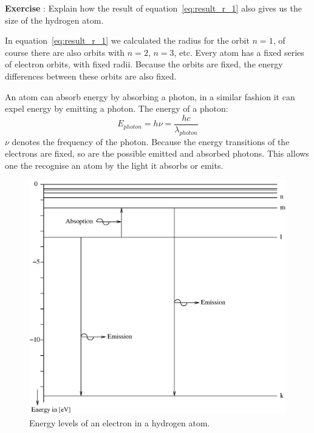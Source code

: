 \documentclass[12pt,a4paper]{article}
\numberwithin{equation}{section}
\numberwithin{figure}{section}
\newcounter{Exercise}
\numberwithin{table}{section}
\begin{document}
\begin{shaded} \textbf{Exercise \theExercise {}} : Explain how the result of equation~\ref{eq:result_r_1} also gives us the size of the hydrogen atom.\end{shaded}

In equation~\ref{eq:result_r_1} we calculated the radius for the orbit $n=1$, of course there are also orbits with $n=2$, $n=3$, etc. Every atom has a fixed series of electron orbits, with fixed radii. Because the orbits are fixed, the energy differences between these orbits are also fixed.

An atom can absorb energy by absorbing a photon, in a similar fashion it can expel energy by emitting a photon. The energy of a photon:
\begin{equation}
E_{photon} = h\nu = \frac{hc}{\lambda_{photon}} \label{eq:E_photon}
\end{equation}
$\nu$ denotes the frequency of the photon. Because the energy transitions of the electrons are fixed, so are the possible emitted and absorbed photons. This allows one the recognise an atom by the light it absorbs or emits.

\begin{figure}\begin{center}
\includegraphics[scale=0.8]{hydrogen.eps}
\caption{Energy levels of an electron in a hydrogen atom.}\label{fig:shower_angles}
\end{center}\end{figure}
\end{document}
